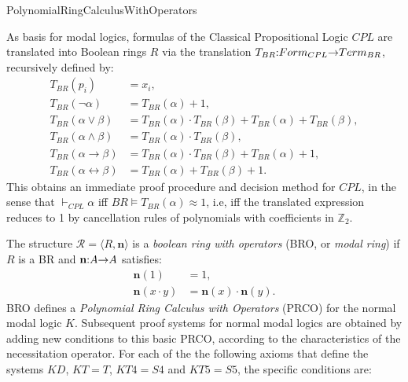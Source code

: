 \begin{entry}{PolynomialRingCalculusWithOperators}  

\newcommand{\fn}[3]{#1\negthickspace : \negthickspace #2 \negthickspace\to\negthickspace #3}
\def\n{\textbf{n}}
\newcommand{\vdashp}{\vdash_{\approx}}

\begin{calculus} 
 
 As  basis  for modal logics, formulas of   the  Classical Propositional Logic $CPL$ are translated into  Boolean rings   $R$   via  the translation $\fn{T_{BR}}{Form_{CPL}}{Term_{BR}}$, recursively defined by:
\begin{align*}   
	T_{BR}(p_i) &= x_i,\\
	T_{BR}(\neg \alpha) &= T_{BR}(\alpha) + 1,\\
	T_{BR}(\alpha \vee \beta) &= T_{BR}(\alpha) \cdot T_{BR}(\beta) + T_{BR}(\alpha) + T_{BR}(\beta),\\
	T_{BR}(\alpha \wedge \beta) &= T_{BR}(\alpha) \cdot T_{BR}(\beta),\\
	T_{BR}(\alpha \to \beta) &= T_{BR}(\alpha) \cdot T_{BR}(\beta) + T_{BR}(\alpha) + 1,\\
	T_{BR}(\alpha \leftrightarrow \beta) &= T_{BR}(\alpha) + T_{BR}(\beta) + 1. 
\end{align*}
This obtains an  immediate  proof  procedure and decision  method for $CPL$, in the sense that
 $\vdash_{CPL} \alpha$ iff  $BR \vDash T_{BR}(\alpha) \approx 1$,
i.e, iff the translated expression reduces to 1 by cancellation rules of  polynomials with  coefficients
in $\mathbb{Z}_{2}$.
 
 The  structure   $\mathcal{R}=\langle R,  \n \rangle$ is a \emph{boolean ring with operators} (BRO, or \emph{modal ring})  if $R$ is a BR and $\fn{\n}{A}{A}$ satisfies:
	\begin{align*}
		\n(1) &= 1,\\
		\n(x \cdot y) &= \n(x) \cdot \n(y).
	\end{align*}
BRO defines a   \emph{Polynomial Ring Calculus with Operators} (PRCO) for the  normal modal  logic   $K$. Subsequent  proof  systems for  normal modal logics are obtained by adding  new conditions to this basic PRCO, according to the characteristics of the   necessitation operator. For each of the  the following axioms that   define the systems $KD$, $KT= T$, $KT4 = S4$ and $KT5= S5$,  the specific  conditions are:



\end{calculus}
\end{entry}

